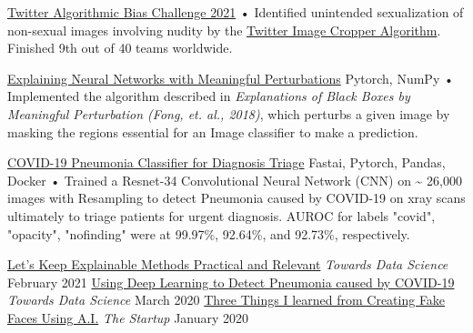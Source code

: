 \documentclass[]{awesome-cv}
\begin{document}
\vspace{-10mm}
\begin{cventries}
	\cventry
	{}
	{\href{https://github.com/ajsanjoaquin/twitter-bias-challenge}{Twitter Algorithmic Bias Challenge 2021}}
	{}
	{}
	{• Identified unintended sexualization of non-sexual images involving nudity by the \href{https://github.com/twitter-research/image-crop-analysis}{Twitter Image Cropper Algorithm}. Finished 9th out of 40 teams worldwide.}
	
	\vspace{-1mm}
	\cventry
	{}
	{\href{https://github.com/ajsanjoaquin/mPerturb}{Explaining Neural Networks with Meaningful Perturbations}}
	{Pytorch, NumPy}
	{}
	{• Implemented the algorithm described in \textit{Explanations of Black Boxes by Meaningful Perturbation (Fong, et. al., 2018)}, which perturbs a given image by masking the regions essential for an Image classifier to make a prediction.}
	
	\vspace{-1mm}
	\cventry
	{}
	{\href{https://github.com/ajsanjoaquin/COVID-19-Scanner}{COVID-19 Pneumonia Classifier for Diagnosis Triage}}
	{Fastai, Pytorch, Pandas, Docker}
	{}
	{• Trained a Resnet-34 Convolutional Neural Network (CNN) on \textasciitilde{} 26,000 images with Resampling to detect Pneumonia caused by COVID-19 on xray scans ultimately to triage patients for urgent diagnosis. AUROC for labels "covid", "opacity", "nofinding" were at 99.97\%, 92.64\%, and 92.73\%, respectively.}

	
	\vspace{-4mm}
\end{cventries}
\begin{cvhonors}
	\cvhonor
	{\href{https://towardsdatascience.com/lets-keep-explainable-methods-practical-and-relevant-92e963ce3f64}{Let’s Keep Explainable Methods Practical and Relevant}}
	{\textit{Towards Data Science}}
	{}
	{February 2021}
	\cvhonor
	{\href{https://towardsdatascience.com/using-deep-learning-to-detect-ncov-19-from-x-ray-images-1a89701d1acd}{Using Deep Learning to Detect Pneumonia caused by COVID-19}}
	{\textit{Towards Data Science}}
	{}
	{March 2020}
	\cvhonor
	{\href{https://medium.com/swlh/three-things-i-learned-from-creating-fake-faces-using-ai-fc4c95282a37}{Three Things I learned from Creating Fake Faces Using A.I.}}
	{\textit{The Startup}}
	{}
	{January 2020}
\end{cvhonors}
\vspace{-20mm}
\ 
\end{document}
